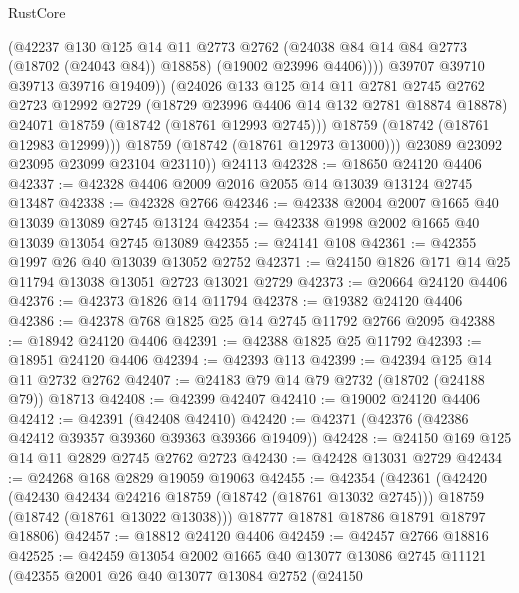 \begin{lexlean}{RustCore}
\begin{coremodule}
                    (@42237
                      @130
                      @125
                      @14
                      @11
                      @2773
                      @2762
                      (@24038 @84 @14 @84 @2773 (@18702 (@24043 @84)) @18858)
                      (@19002 @23996 @4406))))
                @39707
                @39710
                @39713
                @39716
                @19409))
            (@24026
              @133
              @125
              @14
              @11
              @2781
              @2745
              @2762
              @2723
              @12992
              @2729
              (@18729 @23996 @4406 @14 @132 @2781 @18874 @18878)
              @24071
              @18759
              (@18742 (@18761 @12993 @2745)))
            @18759
            (@18742 (@18761 @12983 @12999)))
          @18759
          (@18742 (@18761 @12973 @13000)))
        @23089
        @23092
        @23095
        @23099
        @23104
        @23110))
    @24113
@42328 := @18650 @24120 @4406
@42337 := @42328 @4406 @2009 @2016 @2055 @14 @13039 @13124 @2745 @13487
@42338 := @42328 @2766
@42346 := @42338 @2004 @2007 @1665 @40 @13039 @13089 @2745 @13124
@42354 := @42338 @1998 @2002 @1665 @40 @13039 @13054 @2745 @13089
@42355 := @24141 @108
@42361 := @42355 @1997 @26 @40 @13039 @13052 @2752
@42371 := @24150 @1826 @171 @14 @25 @11794 @13038 @13051 @2723 @13021 @2729
@42373 := @20664 @24120 @4406
@42376 := @42373 @1826 @14 @11794
@42378 := @19382 @24120 @4406
@42386 := @42378 @768 @1825 @25 @14 @2745 @11792 @2766 @2095
@42388 := @18942 @24120 @4406
@42391 := @42388 @1825 @25 @11792
@42393 := @18951 @24120 @4406
@42394 := @42393 @113
@42399 := @42394 @125 @14 @11 @2732 @2762
@42407 := @24183 @79 @14 @79 @2732 (@18702 (@24188 @79)) @18713
@42408 := @42399 @42407
@42410 := @19002 @24120 @4406
@42412 := @42391 (@42408 @42410)
@42420 := @42371 (@42376 (@42386 @42412 @39357 @39360 @39363 @39366 @19409))
@42428 := @24150 @169 @125 @14 @11 @2829 @2745 @2762 @2723
@42430 := @42428 @13031 @2729
@42434 := @24268 @168 @2829 @19059 @19063
@42455 := @42354
    (@42361
      (@42420
        (@42430 @42434 @24216 @18759 (@18742 (@18761 @13032 @2745)))
        @18759
        (@18742 (@18761 @13022 @13038)))
      @18777
      @18781
      @18786
      @18791
      @18797
      @18806)
@42457 := @18812 @24120 @4406
@42459 := @42457 @2766 @18816
@42525 := @42459
    @13054
    @2002
    @1665
    @40
    @13077
    @13086
    @2745
    @11121
    (@42355
      @2001
      @26
      @40
      @13077
      @13084
      @2752
      (@24150

\end{coremodule}
\end{lexlean}
